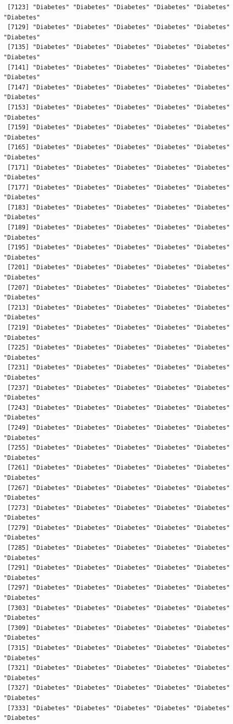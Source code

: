 \documentclass[
  letterpaper,
  DIV=11,
  numbers=noendperiod]{scrartcl}
\begin{document}
\begin{verbatim}
 [7123] "Diabetes" "Diabetes" "Diabetes" "Diabetes" "Diabetes" "Diabetes"
 [7129] "Diabetes" "Diabetes" "Diabetes" "Diabetes" "Diabetes" "Diabetes"
 [7135] "Diabetes" "Diabetes" "Diabetes" "Diabetes" "Diabetes" "Diabetes"
 [7141] "Diabetes" "Diabetes" "Diabetes" "Diabetes" "Diabetes" "Diabetes"
 [7147] "Diabetes" "Diabetes" "Diabetes" "Diabetes" "Diabetes" "Diabetes"
 [7153] "Diabetes" "Diabetes" "Diabetes" "Diabetes" "Diabetes" "Diabetes"
 [7159] "Diabetes" "Diabetes" "Diabetes" "Diabetes" "Diabetes" "Diabetes"
 [7165] "Diabetes" "Diabetes" "Diabetes" "Diabetes" "Diabetes" "Diabetes"
 [7171] "Diabetes" "Diabetes" "Diabetes" "Diabetes" "Diabetes" "Diabetes"
 [7177] "Diabetes" "Diabetes" "Diabetes" "Diabetes" "Diabetes" "Diabetes"
 [7183] "Diabetes" "Diabetes" "Diabetes" "Diabetes" "Diabetes" "Diabetes"
 [7189] "Diabetes" "Diabetes" "Diabetes" "Diabetes" "Diabetes" "Diabetes"
 [7195] "Diabetes" "Diabetes" "Diabetes" "Diabetes" "Diabetes" "Diabetes"
 [7201] "Diabetes" "Diabetes" "Diabetes" "Diabetes" "Diabetes" "Diabetes"
 [7207] "Diabetes" "Diabetes" "Diabetes" "Diabetes" "Diabetes" "Diabetes"
 [7213] "Diabetes" "Diabetes" "Diabetes" "Diabetes" "Diabetes" "Diabetes"
 [7219] "Diabetes" "Diabetes" "Diabetes" "Diabetes" "Diabetes" "Diabetes"
 [7225] "Diabetes" "Diabetes" "Diabetes" "Diabetes" "Diabetes" "Diabetes"
 [7231] "Diabetes" "Diabetes" "Diabetes" "Diabetes" "Diabetes" "Diabetes"
 [7237] "Diabetes" "Diabetes" "Diabetes" "Diabetes" "Diabetes" "Diabetes"
 [7243] "Diabetes" "Diabetes" "Diabetes" "Diabetes" "Diabetes" "Diabetes"
 [7249] "Diabetes" "Diabetes" "Diabetes" "Diabetes" "Diabetes" "Diabetes"
 [7255] "Diabetes" "Diabetes" "Diabetes" "Diabetes" "Diabetes" "Diabetes"
 [7261] "Diabetes" "Diabetes" "Diabetes" "Diabetes" "Diabetes" "Diabetes"
 [7267] "Diabetes" "Diabetes" "Diabetes" "Diabetes" "Diabetes" "Diabetes"
 [7273] "Diabetes" "Diabetes" "Diabetes" "Diabetes" "Diabetes" "Diabetes"
 [7279] "Diabetes" "Diabetes" "Diabetes" "Diabetes" "Diabetes" "Diabetes"
 [7285] "Diabetes" "Diabetes" "Diabetes" "Diabetes" "Diabetes" "Diabetes"
 [7291] "Diabetes" "Diabetes" "Diabetes" "Diabetes" "Diabetes" "Diabetes"
 [7297] "Diabetes" "Diabetes" "Diabetes" "Diabetes" "Diabetes" "Diabetes"
 [7303] "Diabetes" "Diabetes" "Diabetes" "Diabetes" "Diabetes" "Diabetes"
 [7309] "Diabetes" "Diabetes" "Diabetes" "Diabetes" "Diabetes" "Diabetes"
 [7315] "Diabetes" "Diabetes" "Diabetes" "Diabetes" "Diabetes" "Diabetes"
 [7321] "Diabetes" "Diabetes" "Diabetes" "Diabetes" "Diabetes" "Diabetes"
 [7327] "Diabetes" "Diabetes" "Diabetes" "Diabetes" "Diabetes" "Diabetes"
 [7333] "Diabetes" "Diabetes" "Diabetes" "Diabetes" "Diabetes" "Diabetes"

\end{verbatim}
\end{document}
